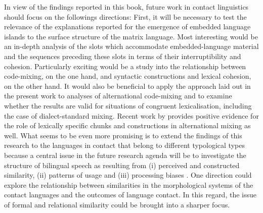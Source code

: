 In view of the findings reported in this book, future work in contact linguistics should focus on the followings directions: First, it will be necessary to test the relevance of the explanations reported for the emergence of embedded language islands to the surface structure of the matrix language. Most interesting would be an in-depth analysis of the slots which accommodate embedded-language material and the sequences preceding these slots in terms of their interruptibility and cohesion. Particularly exciting would be a study into the relationship between code-mixing, on the one hand, and syntactic constructions and lexical cohesion, on the other hand. It would also be beneficial to apply the approach laid out in the present work to analyses of alternational code-mixing and to examine whether the results are valid for situations of congruent lexicalisation, including the case of dialect-standard mixing. Recent work by \citet{goria-units} provides positive evidence for the role of lexically specific chunks and constructions in alternational mixing as well. What seems to be even more promising is to extend the findings of this research to the languages in contact that belong to different typological types because a central issue in the future research agenda will be to investigate the structure of bilingual speech as resulting from (i) perceived and constructed similarity, (ii) patterns of usage and (iii) processing biases \citep[see the papers in][]{hakimov-backus-20}. One direction could explore the relationship between similarities in the morphological systems of the contact languages and the outcomes of language contact. In this regard, the issue of formal and relational similarity could be brought into a sharper focus.
